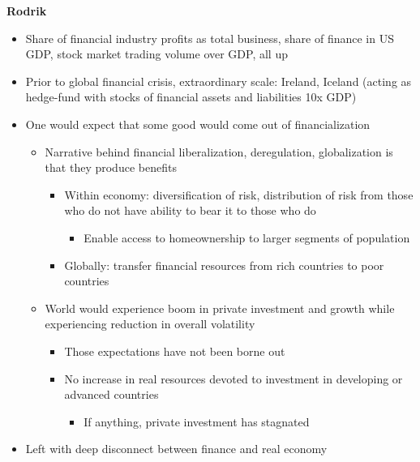 \textbf{Rodrik}

\begin{itemize}
\tightlist
\item
  Share of financial industry profits as total business, share of
  finance in US GDP, stock market trading volume over GDP, all up
\item
  Prior to global financial crisis, extraordinary scale: Ireland,
  Iceland (acting as hedge-fund with stocks of financial assets and
  liabilities 10x GDP)
\item
  One would expect that some good would come out of financialization

  \begin{itemize}
  \tightlist
  \item
    Narrative behind financial liberalization, deregulation,
    globalization is that they produce benefits

    \begin{itemize}
    \tightlist
    \item
      Within economy: diversification of risk, distribution of risk from
      those who do not have ability to bear it to those who do

      \begin{itemize}
      \tightlist
      \item
        Enable access to homeownership to larger segments of population
      \end{itemize}
    \item
      Globally: transfer financial resources from rich countries to poor
      countries
    \end{itemize}
  \item
    World would experience boom in private investment and growth while
    experiencing reduction in overall volatility

    \begin{itemize}
    \tightlist
    \item
      Those expectations have not been borne out
    \item
      No increase in real resources devoted to investment in developing
      or advanced countries

      \begin{itemize}
      \tightlist
      \item
        If anything, private investment has stagnated
      \end{itemize}
    \end{itemize}
  \end{itemize}
\item
  Left with deep disconnect between finance and real economy


\end{itemize}
